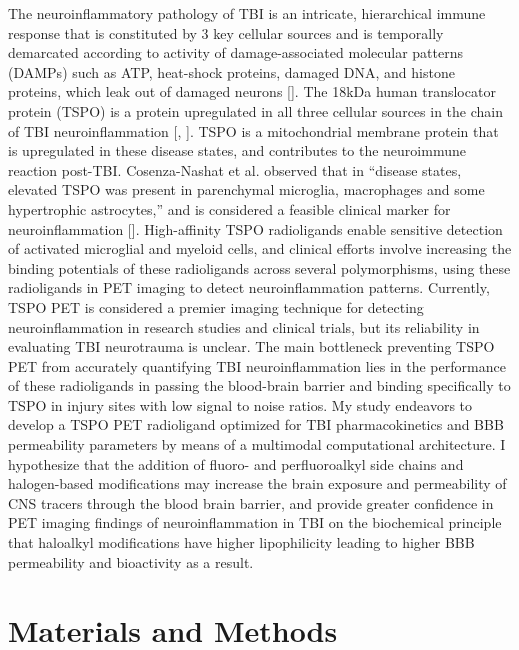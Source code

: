 \documentclass[times, twoside]{zHenriquesLab-StyleBioRxiv}
\begin{document}
		The neuroinflammatory pathology of TBI is an intricate, hierarchical immune response that is constituted by 3 key cellular sources and is temporally demarcated according to activity of damage-associated molecular patterns (DAMPs) such as ATP, heat-shock proteins, damaged DNA, and histone proteins, which leak out of damaged neurons [\cite{al2020}]. The 18kDa human translocator protein (TSPO) is a protein upregulated in all three cellular sources in the chain of TBI neuroinflammation [\cite{lavisse2012}, \cite{cosenzanashat2009}]. TSPO is a mitochondrial membrane protein that is upregulated in these disease states, and contributes to the neuroimmune reaction post-TBI. Cosenza-Nashat et al. observed that in “disease states, elevated TSPO was present in parenchymal microglia, macrophages and some hypertrophic astrocytes,” and is considered a feasible clinical marker for neuroinflammation [\cite{cosenzanashat2009}]. High-affinity TSPO radioligands enable sensitive detection of activated microglial and myeloid cells, and clinical efforts involve increasing the binding potentials of these radioligands across several polymorphisms, using these radioligands in PET imaging to detect neuroinflammation patterns. Currently, TSPO PET is considered a premier imaging technique for detecting neuroinflammation in research studies and clinical trials, but its reliability in evaluating TBI neurotrauma is unclear. The main bottleneck preventing TSPO PET from accurately quantifying TBI neuroinflammation lies in the performance of these radioligands in passing the blood-brain barrier and binding specifically to TSPO in injury sites with low signal to noise ratios. My study endeavors to develop a TSPO PET radioligand optimized for TBI pharmacokinetics and BBB permeability parameters by means of a multimodal computational architecture. I hypothesize that the addition of fluoro- and perfluoroalkyl side chains and halogen-based modifications may increase the brain exposure and permeability of CNS tracers through the blood brain barrier, and provide greater confidence in PET imaging findings of neuroinflammation in TBI on the biochemical principle that haloalkyl modifications have higher lipophilicity leading to higher BBB permeability and bioactivity as a result. 
		
		
		
		\section*{Materials and Methods}
		
\end{document}
